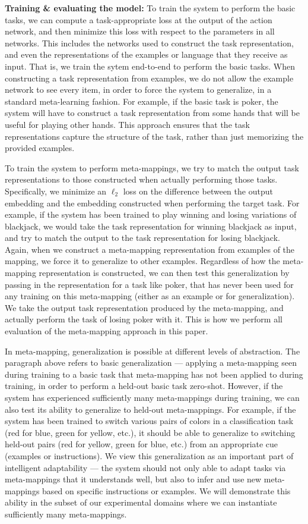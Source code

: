 \textbf{Training \& evaluating the model:} To train the system to perform the basic tasks, we can compute a task-appropriate loss at the output of the action network, and then minimize this loss with respect to the parameters in all networks. This includes the networks used to construct the task representation, and even the representations of the examples or language that they receive as input. That is, we train the sytem end-to-end to perform the basic tasks. When constructing a task representation from examples, we do not allow the example network to see every item, in order to force the system to generalize, in a standard meta-learning fashion. For example, if the basic task is poker, the system will have to construct a task representation from some hands that will be useful for playing other hands. This approach ensures that the task representations capture the structure of the task, rather than just memorizing the provided examples. 

To train the system to perform meta-mappings, we try to match the output task representations to those constructed when actually performing those tasks. Specifically, we minimize an \(\ell_2\) loss on the difference between the output embedding and the embedding constructed when performing the target task. For example, if the system has been trained to play winning and losing variations of blackjack, we would take the task representation for winning blackjack as input, and try to match the output to the task representation for losing blackjack. Again, when we construct a meta-mapping representation from examples of the mapping, we force it to generalize to other examples. Regardless of how the meta-mapping representation is constructed, we can then test this generalization by passing in the representation for a task like poker, that has never been used for any training on this meta-mapping (either as an example or for generalization). We take the output task representation produced by the meta-mapping, and actually perform the task of losing poker with it. This is how we perform all evaluation of the meta-mapping approach in this paper.

In meta-mapping, generalization is possible at different levels of abstraction. The paragraph above refers to basic generalization --- applying a meta-mapping seen during training to a basic task that meta-mapping has not been applied to during training, in order to perform a held-out basic task zero-shot. However, if the system has experienced sufficiently many meta-mappings during training, we can also test its ability to generalize to held-out meta-mappings. For example, if the system has been trained to switch various pairs of colors in a classification task (red for blue, green for yellow, etc.), it should be able to generalize to switching held-out pairs (red for yellow, green for blue, etc.) from an appropriate cue (examples or instructions). We view this generalization as an important part of intelligent adaptability --- the system should not only able to adapt tasks via meta-mappings that it understands well, but also to infer and use new meta-mappings based on specific instructions or examples. We will demonstrate this ability in the subset of our experimental domains where we can instantiate sufficiently many meta-mappings. 

